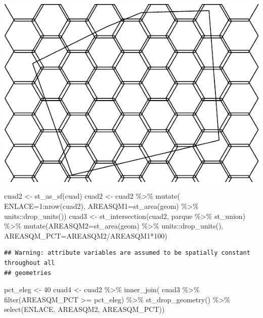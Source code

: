 \documentclass[
  11pt,
]{article}
\newenvironment{Shaded}{\begin{snugshade}}{\end{snugshade}}
\newcommand{\AttributeTok}[1]{\textcolor[rgb]{0.77,0.63,0.00}{#1}}
\newcommand{\DecValTok}[1]{\textcolor[rgb]{0.00,0.00,0.81}{#1}}
\newcommand{\FunctionTok}[1]{\textcolor[rgb]{0.00,0.00,0.00}{#1}}
\newcommand{\NormalTok}[1]{#1}
\newcommand{\OtherTok}[1]{\textcolor[rgb]{0.56,0.35,0.01}{#1}}
\newcommand{\SpecialCharTok}[1]{\textcolor[rgb]{0.00,0.00,0.00}{#1}}
\begin{document}
\includegraphics{README_files/figure-latex/unnamed-chunk-3-1.pdf}

\begin{Shaded}
\begin{Highlighting}[]
\NormalTok{cuad2 }\OtherTok{\textless{}{-}} \FunctionTok{st\_as\_sf}\NormalTok{(cuad)}
\NormalTok{cuad2 }\OtherTok{\textless{}{-}}\NormalTok{ cuad2 }\SpecialCharTok{\%\textgreater{}\%}
  \FunctionTok{mutate}\NormalTok{(}
    \AttributeTok{ENLACE=}\DecValTok{1}\SpecialCharTok{:}\FunctionTok{nrow}\NormalTok{(cuad2),}
    \AttributeTok{AREASQM1=}\FunctionTok{st\_area}\NormalTok{(geom) }\SpecialCharTok{\%\textgreater{}\%}\NormalTok{ units}\SpecialCharTok{::}\FunctionTok{drop\_units}\NormalTok{())}
\NormalTok{cuad3 }\OtherTok{\textless{}{-}} \FunctionTok{st\_intersection}\NormalTok{(cuad2, parque }\SpecialCharTok{\%\textgreater{}\%}\NormalTok{ st\_union) }\SpecialCharTok{\%\textgreater{}\%}
  \FunctionTok{mutate}\NormalTok{(}\AttributeTok{AREASQM2=}\FunctionTok{st\_area}\NormalTok{(geom) }\SpecialCharTok{\%\textgreater{}\%}\NormalTok{ units}\SpecialCharTok{::}\FunctionTok{drop\_units}\NormalTok{(),}
         \AttributeTok{AREASQM\_PCT=}\NormalTok{AREASQM2}\SpecialCharTok{/}\NormalTok{AREASQM1}\SpecialCharTok{*}\DecValTok{100}\NormalTok{)}
\end{Highlighting}
\end{Shaded}

\begin{verbatim}
## Warning: attribute variables are assumed to be spatially constant throughout all
## geometries
\end{verbatim}

\begin{Shaded}
\begin{Highlighting}[]
\NormalTok{pct\_eleg }\OtherTok{\textless{}{-}} \DecValTok{40}
\NormalTok{cuad4 }\OtherTok{\textless{}{-}}\NormalTok{ cuad2 }\SpecialCharTok{\%\textgreater{}\%}
  \FunctionTok{inner\_join}\NormalTok{(}
\NormalTok{    cuad3 }\SpecialCharTok{\%\textgreater{}\%}
      \FunctionTok{filter}\NormalTok{(AREASQM\_PCT }\SpecialCharTok{\textgreater{}=}\NormalTok{ pct\_eleg) }\SpecialCharTok{\%\textgreater{}\%}
      \FunctionTok{st\_drop\_geometry}\NormalTok{() }\SpecialCharTok{\%\textgreater{}\%}
      \FunctionTok{select}\NormalTok{(ENLACE, AREASQM2, AREASQM\_PCT))}
\end{Highlighting}
\end{Shaded}
\end{document}
